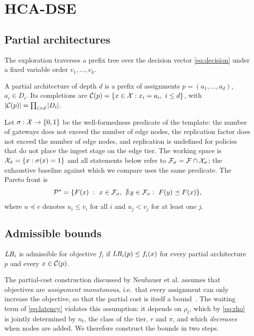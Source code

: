 \section{HCA-DSE}
\label{sec:method}

\subsection{Partial architectures}
The exploration traverses a prefix tree over the decision vector \eqref{eq:decision}
under a fixed variable order $v_1,\dots,v_k$.

\begin{definition}
A partial architecture of depth $d$ is a prefix of assignments
$p=(a_1,\dots,a_d)$, $a_i\in D_i$. Its completions are
$\C(p)=\{x\in\X: x_i=a_i,\ i\le d\}$, with $|\mathcal{C}(p)|=\prod_{i>d}|D_i|$.
\end{definition}

Let $\sigma:\mathcal{X}\to\{0,1\}$ be the well-formedness predicate of the template: the number of
gateways does not exceed the number of edge nodes, the replication factor does not exceed
the number of edge nodes, and replication is undefined for policies that do not place the
ingest stage on the edge tier. The working space is $\mathcal{X}_\sigma=\{x:\sigma(x)=1\}$ and all
statements below refer to $\mathcal{F}_\sigma=\mathcal{F}\cap\mathcal{X}_\sigma$; the exhaustive baseline against
which we compare uses the same predicate. The Pareto front is
\begin{equation}
\PS=\{F(x)\ :\ x\in\F_\sigma,\ \nexists\,y\in\F_\sigma:\ F(y)\preceq F(x)\},
\end{equation}
where $u\preceq v$ denotes $u_i\le v_i$ for all $i$ and $u_j<v_j$ for at least one $j$.

\subsection{Admissible bounds}

\begin{definition}[Admissibility]
$\mathit{LB}_i$ is admissible for objective $f_i$ if
$\mathit{LB}_i(p)\le f_i(x)$ for every partial architecture $p$ and every $x\in\mathcal{C}(p)$.
\end{definition}

The partial-cost construction discussed by Neubauer et al. assumes that objectives are
\emph{assignment monotonous}, i.e.\ that every assignment can only increase the objective,
so that the partial cost is itself a bound~\cite{neubauer2018exact}. The waiting term of
\eqref{eq:latency} violates this assumption: it depends on $\rho_t$, which by
\eqref{eq:rho} is jointly determined by $n_t$, the class of the tier, $r$ and $\pi$, and
which \emph{decreases} when nodes are added. We therefore construct the bounds in two
steps.

